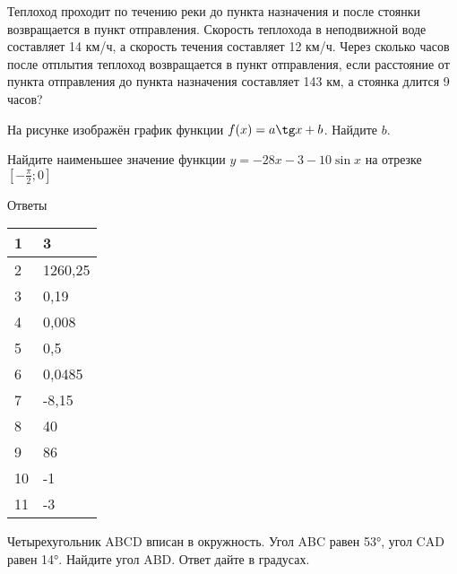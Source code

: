 \documentclass[twocolumn]{article}
\begin{document}
\begin{taskBN}{9}
Теплоход проходит по течению реки до пункта назначения и после стоянки возвращается в пункт отправления. Скорость теплохода в неподвижной воде составляет 14 км/ч, а скорость течения составляет 12 км/ч. Через сколько часов после отплытия теплоход возвращается в пункт отправления, если расстояние от пункта отправления до пункта назначения составляет 143 км, а стоянка длится 9 часов? 
\end{taskBN}

\begin{taskBN}{10}
На рисунке изображён график функции $f(x)=a\tg x+b$. Найдите $b$.\vspace{2.5cm}
\end{taskBN}

\begin{taskBN}{11}
Найдите наименьшее значение функции $y = -28x-3-10\sin x$ на отрезке $\left[-\frac{\pi}{2};0 \right]$
\end{taskBN}

\newpage
 Ответы

\begin{table}[h]\begin{tabular}{|l|l|}
\hline
1 & 3
\\
\hline
2 & 1260,25
\\
\hline
3 & 0,19
\\
\hline
4 & 0,008
\\
\hline
5 & 0,5
\\
\hline
6 & 0,0485
\\
\hline
7 & -8,15
\\
\hline
8 & 40
\\
\hline
9 & 86
\\
\hline
10 & -1
\\
\hline
11 & -3
\\
\hline
\end{tabular}\end{table}



\newpage




\cleardoublepage
\def\examvart{Вариант 19.2}
\normalsize

\startpartone
\large




\begin{taskBN}{1}
Четырехугольник ABCD вписан в окружность. Угол ABC равен 53°, угол CAD равен 14°. Найдите угол ABD. Ответ дайте в градусах.
\end{taskBN}
\end{document}
